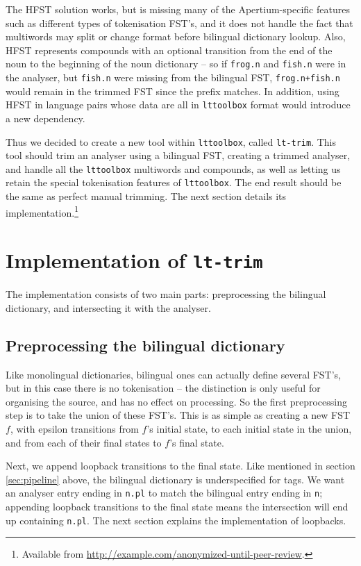 \documentclass[10pt, a4paper]{article}
\newcommand{\ana}[1]{\texttt{#1}}
\newcommand{\tool}[1]{\texttt{#1}}
\begin{document}
The HFST solution works, but is missing many of the Apertium-specific
features such as different types of tokenisation FST's, and it does
not handle the fact that multiwords may split or change format before
bilingual dictionary lookup. Also, HFST represents compounds with an
optional transition from the end of the noun to the beginning of the
noun dictionary -- so if \ana{frog.n} and \ana{fish.n} were in the
analyser, but \ana{fish.n} were missing from the bilingual FST,
\ana{frog.n+fish.n} would remain in the trimmed FST since the prefix
matches. In addition, using HFST in language pairs whose data are all
in \tool{lttoolbox} format would introduce a new dependency.

Thus we decided to create a new tool within \tool{lttoolbox}, called
\tool{lt-trim}. This tool should trim an analyser using a bilingual
FST, creating a trimmed analyser, and handle all the \tool{lttoolbox}
multiwords and compounds, as well as letting us retain the special
tokenisation features of \tool{lttoolbox}. The end result should be
the same as perfect manual trimming. The next section details its
implementation.\footnote{Available from
  \href{http://example.com/anonymized-until-peer-review}{http://example.com/anonymized-until-peer-review}.}


\section{Implementation of \tool{lt-trim}}

The implementation consists of two main parts: preprocessing the
bilingual dictionary, and intersecting it with the analyser. 


\subsection{Preprocessing the bilingual dictionary}

Like monolingual dictionaries, bilingual ones can actually define
several FST's, but in this case there is no tokenisation -- the
distinction is only useful for organising the source, and has no
effect on processing. So the first preprocessing step is to take the
union of these FST's. This is as simple as creating a new FST $f$,
with epsilon transitions from $f$'s initial state, to each initial
state in the union, and from each of their final states to $f$'s final
state.

Next, we append loopback transitions to the final state. Like
mentioned in section \ref{sec:pipeline} above, the bilingual
dictionary is underspecified for tags. We want an analyser entry
ending in \ana{n.pl} to match the bilingual entry ending in \ana{n};
appending loopback transitions to the final state means the
intersection will end up containing \ana{n.pl}. The next section
explains the implementation of loopbacks. 
\end{document}

